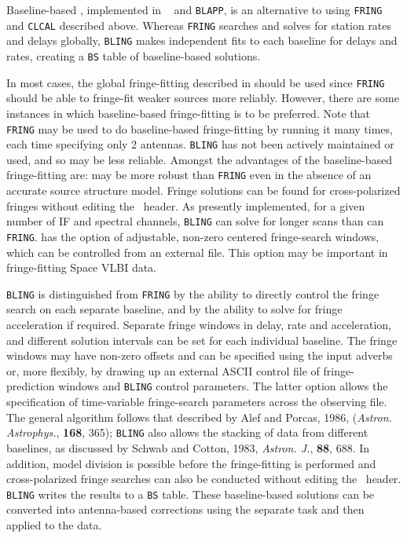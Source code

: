 
Baseline-based , implemented in {\tt
{}} and {\tt BLAPP}, is an alternative to using {\tt FRING}
and {\tt CLCAL} described above.  Whereas {\tt FRING} searches and
solves for station rates and delays globally, {\tt BLING} makes
independent fits to each baseline for delays and rates, creating a
{\tt BS} table of baseline-based solutions.

In most cases, the global fringe-fitting described in 
should be used since {\tt FRING} should be able to fringe-fit weaker
sources more reliably.  However, there are some instances in which
baseline-based fringe-fitting is to be preferred.  Note that {\tt
FRING} may be used to do baseline-based fringe-fitting by running it
many times, each time specifying only 2 antennas.  {\tt BLING} has not
been actively maintained or used, and so may be less reliable.
Amongst the advantages of the baseline-based fringe-fitting are:
\xben
{} may be more robust than {\tt FRING} even in the
     absence of an accurate source structure model.
\Item Fringe solutions can be found for cross-polarized fringes
     without editing the \uv\ header.
\Item As presently implemented, for a given number of IF and spectral
     channels, {\tt BLING} can  solve for longer scans than can {\tt
     FRING}\@.
 has the option of adjustable, non-zero centered
     fringe-search windows, which can be controlled from an external
     file.  This option may be important in fringe-fitting Space VLBI
     data.
\xeen

{\tt BLING} is distinguished from {\tt FRING} by the ability to
directly control the fringe search on each separate baseline, and by
the ability to solve for fringe acceleration if required. Separate
fringe windows in delay, rate and acceleration, and different solution
intervals can be set for each individual baseline. The fringe windows
may have non-zero offsets and can be specified using the input adverbs
or, more flexibly, by drawing up an external ASCII control file of
fringe-prediction windows and {\tt BLING} control parameters. The
latter option allows the specification of time-variable fringe-search
parameters across the observing file. The general algorithm follows
that described by Alef and Porcas, 1986, ({\it Astron. Astrophys.\/},
{\bf 168}, 365); {\tt BLING} also allows the stacking of data from
different baselines, as discussed by Schwab and Cotton, 1983, {\it
Astron. J.\/}, {\bf 88}, 688. In addition, model division is possible
before the fringe-fitting is performed and cross-polarized fringe
searches can also be conducted without editing the \uv\ header.  {\tt
BLING} writes the results to a {\tt BS} table. These baseline-based
solutions can be converted into antenna-based corrections using the
separate task {\tt {}} and then applied to the data.


